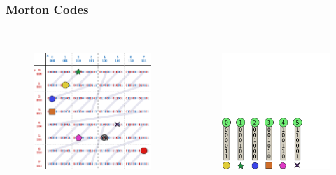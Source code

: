 \documentclass{beamer}
\begin{document}
\begin{frame}
  \frametitle{Morton Codes}
  
\begin{columns}[t]

\begin{figure}
\includegraphics[height=55mm]{Z-curve-primitives.png}
\end{figure}

\begin{figure}
\includegraphics[height=55mm]{keys_5.png}
\end{figure}
\end{columns}
\end{frame}
\end{document}
